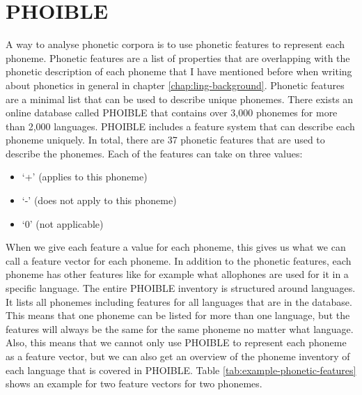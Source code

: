 \section{PHOIBLE}
\label{sec:phoible}
A way to analyse phonetic corpora is to use phonetic features to represent each phoneme. Phonetic features are a list of properties that are overlapping with the phonetic description of each phoneme that I have mentioned before when writing about phonetics in general in chapter \ref{chap:ling-background}. Phonetic features are a minimal list that can be used to describe unique phonemes. There exists an online database called PHOIBLE \citep{phoible} that contains over 3,000 phonemes for more than 2,000 languages. PHOIBLE includes a feature system that can describe each phoneme uniquely. In total, there are 37 phonetic features that are used to describe the phonemes. Each of the features can take on three values:
\begin{itemize}
    \item `+' (applies to this phoneme)
    \item `-' (does not apply to this phoneme)
    \item `0' (not applicable)
\end{itemize}
When we give each feature a value for each phoneme, this gives us what we can call a feature vector for each phoneme. In addition to the phonetic features, each phoneme has other features like for example what allophones are used for it in a specific language. The entire PHOIBLE inventory is structured around languages. It lists all phonemes including features for all languages that are in the database. This means that one phoneme can be listed for more than one language, but the features will always be the same for the same phoneme no matter what language. Also, this means that we cannot only use PHOIBLE to represent each phoneme as a feature vector, but we can also get an overview of the phoneme inventory of each language that is covered in PHOIBLE. Table \ref{tab:example-phonetic-features} shows an example for two feature vectors for two phonemes.

